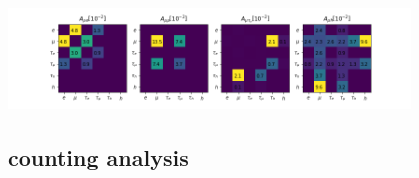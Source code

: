 \begin{frame}{}
    \vspace{0.05\textheight}
    \begin{center}
        \includegraphics[width=0.8\textwidth,trim=3cm 0 3cm 0, clip]{chapters/Analysis/sectionStatisticalAnalysis/figures/acc_mu1b.png}
    \end{center}



\end{frame}







\subsection{counting analysis}


